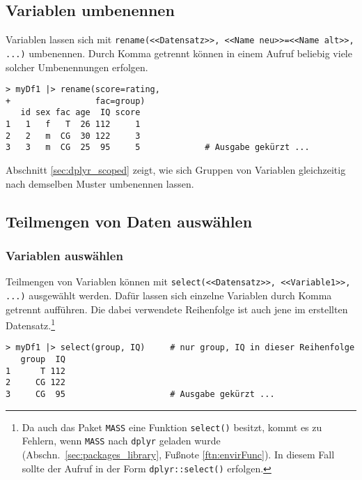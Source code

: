 \subsection{Variablen umbenennen}
\label{sec:dplyr_rename}

Variablen lassen sich mit \lstinline!rename(<<Datensatz>>, <<Name neu>>=<<Name alt>>, ...)! umbenennen. Durch Komma getrennt können in einem Aufruf beliebig viele solcher Umbenennungen erfolgen.
\begin{lstlisting}
> myDf1 |> rename(score=rating,
+                 fac=group)
   id sex fac age  IQ score
1   1   f   T  26 112     1
2   2   m  CG  30 122     3
3   3   m  CG  25  95     5             # Ausgabe gekürzt ...
\end{lstlisting}

Abschnitt \ref{sec:dplyr_scoped} zeigt, wie sich Gruppen von Variablen gleichzeitig nach demselben Muster umbenennen lassen.

\subsection{Teilmengen von Daten auswählen}
\label{sec:dplyr_subset}

\subsubsection{Variablen auswählen}

Teilmengen von Variablen können mit \lstinline!select(<<Datensatz>>, <<Variable1>>, ...)! ausgewählt werden. Dafür lassen sich einzelne Variablen durch Komma getrennt aufführen. Die dabei verwendete Reihenfolge ist auch jene im erstellten Datensatz.\footnote{\label{ftn:select_mass}Da auch das Paket \lstinline!MASS! eine Funktion \lstinline!select()! besitzt, kommt es zu Fehlern, wenn \lstinline!MASS! nach \lstinline!dplyr! geladen wurde (Abschn.\ \ref{sec:packages_library}, Fußnote \ref{ftn:envirFunc}). In diesem Fall sollte der Aufruf in der Form \lstinline!dplyr::select()! erfolgen.}
\begin{lstlisting}
> myDf1 |> select(group, IQ)     # nur group, IQ in dieser Reihenfolge
   group  IQ
1      T 112
2     CG 122
3     CG  95                     # Ausgabe gekürzt ...
\end{lstlisting}

